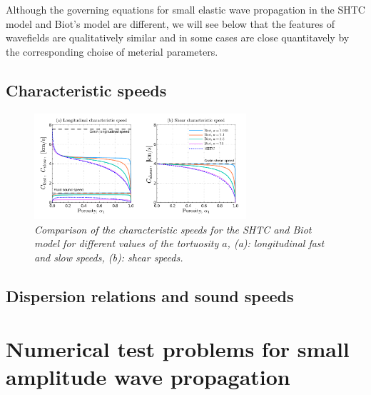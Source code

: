 \documentclass[3p,times]{elsarticle}
\begin{document}
Although the governing equations for small elastic wave propagation in the SHTC model and Biot's model are different, we will see below that the features of wavefields are qualitatively similar and in some cases are close quantitavely by the corresponding choise of meterial parameters.  

\subsection{Characteristic speeds}

\begin{figure}
	\begin{center}
		\includegraphics[draft=false,width=0.70\textwidth]{Figures/Biot_SHTC_speeds_porosity}
	\end{center}
	\vspace{-8mm}
	\caption{{\footnotesize \it Comparison of the characteristic speeds for the SHTC and Biot model 
	for different values of the tortuosity $ a $, (a): longitudinal fast and slow speeds, (b): 
	shear speeds.}}
	\label{fig1}
\end{figure}


\subsection{Dispersion relations and sound speeds}

\section{Numerical test problems for small amplitude wave propagation}
\end{document}
